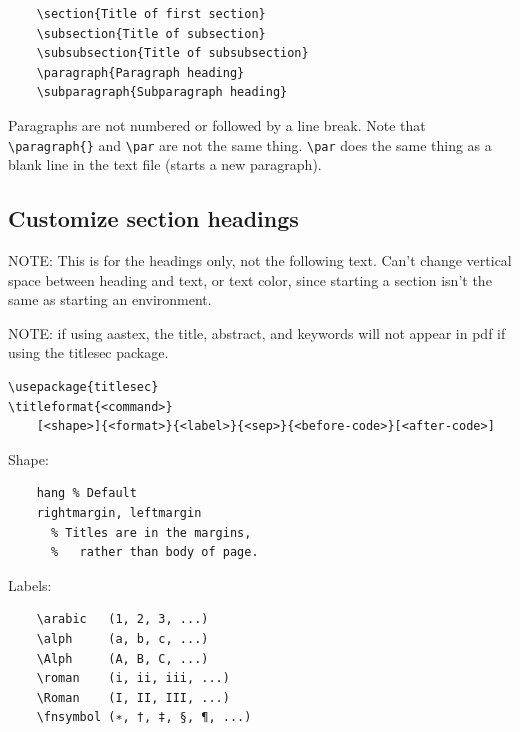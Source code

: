 \documentclass{article}
\begin{document}
\begin{minipage}[t]{0.5\textwidth}
\begin{lstlisting}
    \section{Title of first section}
    \subsection{Title of subsection}
    \subsubsection{Title of subsubsection}
    \paragraph{Paragraph heading}
    \subparagraph{Subparagraph heading}
\end{lstlisting}
\end{minipage}%
\begin{minipage}[t]{0.5\textwidth}
Paragraphs are not numbered or followed by a line break.
Note that \verb|\paragraph{}| and \verb|\par| are not the same thing.
\verb|\par| does the same thing as a blank line in the text file (starts a new paragraph).
\end{minipage}


\subsection{Customize section headings}
NOTE: This is for the headings only, not the following text.
Can't change vertical space between heading and text, or text color, since
starting a section isn't the same as starting an environment.

NOTE: if using aastex, the title, abstract, and keywords will not appear in
pdf if using the titlesec package.
\begin{lstlisting}
\usepackage{titlesec}
\titleformat{<command>}
    [<shape>]{<format>}{<label>}{<sep>}{<before-code>}[<after-code>]
\end{lstlisting}

\begin{minipage}{0.5\textwidth}
Shape:
\begin{lstlisting}
    hang % Default
    rightmargin, leftmargin
      % Titles are in the margins,
      %   rather than body of page.
\end{lstlisting}
\end{minipage}%
\begin{minipage}{0.5\textwidth}
Labels:
\begin{lstlisting}
    \arabic   (1, 2, 3, ...)
    \alph     (a, b, c, ...)
    \Alph     (A, B, C, ...)
    \roman    (i, ii, iii, ...)
    \Roman    (I, II, III, ...)
    \fnsymbol (∗, †, ‡, §, ¶, ...)
\end{lstlisting}
\end{minipage}
\end{document}
